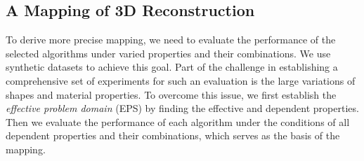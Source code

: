 \subsection{A Mapping of 3D Reconstruction}
To derive more precise mapping, we need to evaluate the performance of the selected algorithms under varied properties and their combinations. We use synthetic datasets to achieve this goal. Part of the challenge in establishing a comprehensive set of experiments for such an evaluation is the large variations of shapes and material properties. To overcome this issue, we first establish the \textit{effective problem domain} (EPS) by finding the effective and dependent properties. Then we evaluate the performance of each algorithm under the conditions of all dependent properties and their combinations, which serves as the basis of the mapping.




